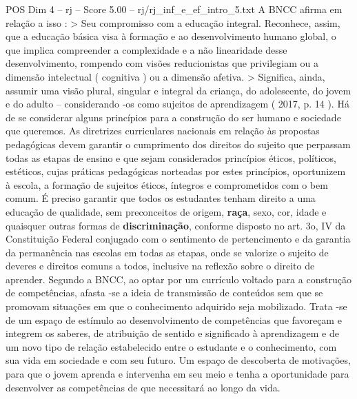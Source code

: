 \begin{textsample}{POS Dim 4 – rj – Score 5.00 – rj/rj\_inf\_e\_ef\_intro\_5.txt}
A BNCC afirma em relação a isso : > Seu compromisso com a educação integral.
Reconhece, assim, que a educação básica visa à formação e ao desenvolvimento humano global, o que implica compreender a complexidade e a não linearidade desse desenvolvimento, rompendo com visões reducionistas que privilegiam ou a dimensão intelectual ( cognitiva ) ou a dimensão afetiva. > Significa, ainda, assumir uma visão plural, singular e integral da criança, do adolescente, do jovem e do adulto – considerando -os como sujeitos de aprendizagem ( 2017, p. 14 ).
Há de se considerar alguns princípios para a construção do ser humano e sociedade que queremos.
As diretrizes curriculares nacionais em relação às propostas pedagógicas devem garantir o cumprimento dos direitos do sujeito que perpassam todas as etapas de ensino e que sejam considerados princípios éticos, políticos, estéticos, cujas práticas pedagógicas norteadas por estes princípios, oportunizem à escola, a formação de sujeitos éticos, íntegros e comprometidos com o bem comum.
É preciso garantir que todos os estudantes tenham direito a uma educação de qualidade, sem preconceitos de origem, \textbf{raça}, sexo, cor, idade e quaisquer outras formas de \textbf{discriminação}, conforme disposto no art. 3o, IV da Constituição Federal conjugado com o sentimento de pertencimento e da garantia da permanência nas escolas em todas as etapas, onde se valorize o sujeito de deveres e direitos comuns a todos, inclusive na reflexão sobre o direito de aprender.
Segundo a BNCC, ao optar por um currículo voltado para a construção de competências, afasta -se a ideia de transmissão de conteúdos sem que se promovam situações em que o conhecimento adquirido seja mobilizado.
Trata -se de um espaço de estímulo ao desenvolvimento de competências que favoreçam e integrem os saberes, de atribuição de sentido e significado à aprendizagem e de um novo tipo de relação estabelecido entre o estudante e o conhecimento, com sua vida em sociedade e com seu futuro.
Um espaço de descoberta de motivações, para que o jovem aprenda e intervenha em seu meio e tenha a oportunidade para desenvolver as competências de que necessitará ao longo da vida.

\end{textsample}
